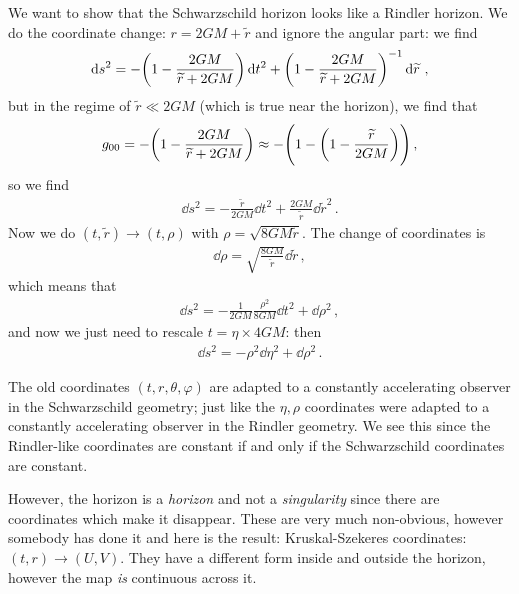 \documentclass[main.tex]{subfiles}
\begin{document}
We want to show that the Schwarzschild horizon looks like a Rindler horizon. We do the coordinate change: \(r = 2GM + \widetilde{r}\) and ignore the angular part: we find 
%
\begin{align}
  \dd{s^2} = - \qty(1 - \frac{2GM}{\widetilde{r} + 2GM}) \dd{t^2} 
+ \qty(1 - \frac{2GM}{\widetilde{r} + 2GM})^{-1} \dd{\widetilde{r}}
\,,
\end{align}
%
but in the regime of \(\widetilde{r}\ll 2GM\) (which is true near the horizon), we find that 
%
\begin{align}
  g_{00} = - \qty(1 - \frac{2GM}{\widetilde{r} + 2GM})
\approx - \qty(1 - \qty(1- \frac{\widetilde{r}}{2GM}))
\,,
\end{align}
%
so we find  
%
\begin{align}
  \dd{s^2} = - \frac{\widetilde{r}}{2GM} \dd{t^2} + \frac{2GM}{\widetilde{r}} \dd{\widetilde{r}^2}
\,.
\end{align}
%
Now we do \((t, \widetilde{r}) \rightarrow (t, \rho )\) with \(\rho = \sqrt{8GM \widetilde{r}}\). The change of coordinates is 
%
\begin{align}
  \dd{\rho } = \sqrt{\frac{8GM}{\widetilde{r}}} \dd{\widetilde{r}}
\,,
\end{align}
%
which means that 
%
\begin{align}
  \dd{s^2} = - \frac{1}{2GM} \frac{\rho^2}{8GM} \dd{t^2} + \dd{\rho^2}
\,,
\end{align}
%
and now we just need to rescale \(t = \eta \times 4GM\): then 
%
\begin{align}
  \dd{s^2} = -\rho^2 \dd{\eta^2 } + \dd{\rho^2} 
\,.
\end{align}

The old coordinates \((t, r, \theta, \varphi )\) are adapted to a constantly accelerating observer in the Schwarzschild geometry; just like the \(\eta, \rho \) coordinates were adapted to a constantly accelerating observer in the Rindler geometry. 
We see this since the Rindler-like coordinates are constant if and only if the Schwarzschild coordinates are constant. 

However, the horizon is a \emph{horizon} and not a \emph{singularity} since there are coordinates which  make it disappear. 
These are very much non-obvious, however somebody has done it and here is the result: Kruskal-Szekeres coordinates: \((t, r) \rightarrow (U, V)\). They have a different form inside and outside the horizon, however the map \emph{is } continuous across it. 
\end{document}
